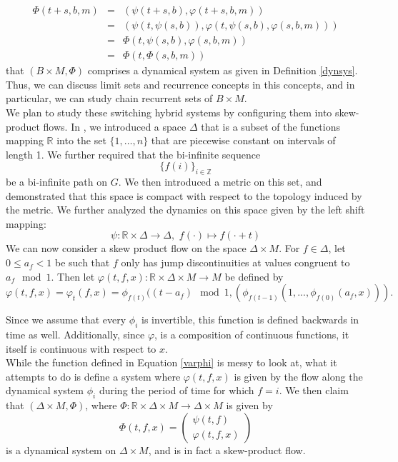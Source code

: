 \documentclass[11pt]{article}
\begin{document}
\begin{eqnarray*}
\Phi(t+s,b,m)&=&(\psi(t+s,b),\varphi(t+s,b,m))\\
&=&(\psi(t,\psi(s,b)),\varphi(t,\psi(s,b),\varphi(s,b,m)))\\
&=&\Phi(t,\psi(s,b),\varphi(s,b,m))\\
&=&\Phi(t,\Phi(s,b,m))
\end{eqnarray*}
that $(B\times M, \Phi)$ comprises a dynamical system as given in Definition \ref{dynsys}.  Thus, we can discuss limit sets and recurrence concepts in this concepts, and in particular, we can study chain recurrent sets of $B\times M$. \\
\indent We plan to study these switching hybrid systems by configuring them into skew-product flows.  In \cite{Ayers2013}, we introduced a space $\Delta$ that is a subset of the functions mapping $\mathbb{R}$ into the set $\{1,\ldots,n\}$ that are piecewise constant on intervals of length 1. We further required that the bi-infinite sequence 
$$\{f(i)\}_{i\in\mathbb{Z}}$$ 
be a bi-infinite path on $G$.  We then introduced a metric on this set, and demonstrated that this space is compact with respect to the topology induced by the metric.  We further analyzed the dynamics on this space given by the left shift mapping:
$$\psi:\mathbb{R}\times\Delta\rightarrow\Delta,\,\, f(\cdot)\mapsto f(\cdot+ t)$$
We can now consider a skew product flow on the space $\Delta\times M$.  For $f \in \Delta$, let $0\leq a_f<1$ be such that $f$ only has jump discontinuities at values congruent to $a_f\mod 1$.  Then let $\varphi(t,f,x):\mathbb{R} \times \Delta\times M \rightarrow M$ be defined by
\begin{equation}\label{varphi}
\varphi (t,f,x) = \varphi_t(f,x)= \phi_{f(t)}((t-a_f)\mod1,(\phi_{f(t-1)}(1,...,\phi_{f(0)}(a_f,x))). 
\end{equation}


Since we assume that every $\phi_i$ is invertible, this function is defined backwards in time as well. Additionally, since $\varphi$, is a composition of continuous functions, it itself is continuous with respect to $x$. \\
\indent While the function defined in Equation \ref{varphi} is messy to look at, what it attempts to do is define a system where $\varphi(t,f,x)$ is given by the flow along the dynamical system $\phi_i$ during the period of time for which $f = i$.  We then claim that $(\Delta\times M, \Phi)$, where $\Phi:\mathbb{R}\times\Delta\times M\rightarrow \Delta\times M$ is given by
\begin{equation*}\label{dynsys}
\Phi(t,f,x) = \left (
\begin{array}{cc}
\psi(t,f)\\
\varphi(t,f,x)
\end{array} \right ) 
\end{equation*}
is a dynamical system on $\Delta\times M$, and is in fact a skew-product flow.
\end{document}
